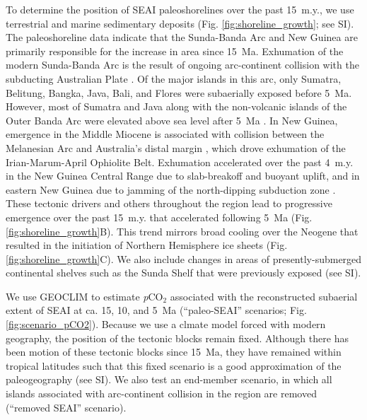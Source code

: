 \documentclass[11pt,letterpaper]{article}
\newcommand{\pCOtwo}{\textit{p}CO$_{2}$\xspace}
\begin{document}
To determine the position of SEAI paleoshorelines over the past 15~m.y., we use terrestrial and marine sedimentary deposits (Fig. \ref{fig:shoreline_growth}; see SI). The paleoshoreline data indicate that the Sunda-Banda Arc and New Guinea are primarily responsible for the increase in area since 15~Ma. Exhumation of the modern Sunda-Banda Arc is the result of ongoing arc-continent collision with the subducting Australian Plate \cite{Harris2006a}. Of the major islands in this arc, only Sumatra, Belitung, Bangka, Java, Bali, and Flores were subaerially exposed before 5~Ma. However, most of Sumatra and Java along with the non-volcanic islands of the Outer Banda Arc were elevated above sea level after 5~Ma \cite{Hall2013b}. In New Guinea, emergence in the Middle Miocene is associated with collision between the Melanesian Arc and Australia's distal margin \cite{Cloos2005a}, which drove exhumation of the Irian-Marum-April Ophiolite Belt. Exhumation accelerated over the past 4~m.y. in the New Guinea Central Range due to slab-breakoff and buoyant uplift, and in eastern New Guinea due to jamming of the north-dipping subduction zone \cite{Cloos2005a}. These tectonic drivers and others throughout the region lead to progressive emergence over the past 15~m.y. that accelerated following 5~Ma (Fig. \ref{fig:shoreline_growth}B). This trend mirrors broad cooling over the Neogene that resulted in the initiation of Northern Hemisphere ice sheets (Fig. \ref{fig:shoreline_growth}C). We also include changes in areas of presently-submerged continental shelves such as the Sunda Shelf that were previously exposed (see SI).

We use GEOCLIM to estimate \pCOtwo associated with the reconstructed subaerial extent of SEAI at ca. 15, 10, and 5~Ma (``paleo-SEAI'' scenarios; Fig. \ref{fig:scenario_pCO2}). Because we use a clmate model forced with modern geography, the position of the tectonic blocks remain fixed. Although there has been motion of these tectonic blocks since 15~Ma, they have remained within tropical latitudes such that this fixed scenario is a good approximation of the paleogeography (see SI). We also test an end-member scenario, in which all islands associated with arc-continent collision in the region are removed (``removed SEAI'' scenario).
\end{document}
